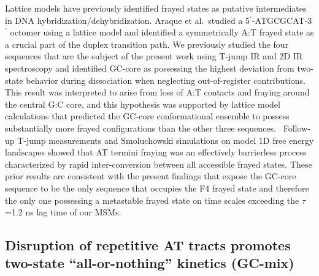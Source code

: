 \documentclass[journal=jpcbfk,manuscript=article]{achemso}
\begin{document}
Lattice models have previously identified frayed states as putative intermediates in DNA hybridization/dehybridization.\citep{Araque2016LatticeCooperativity, Phys2019,Sanstead2016} Araque et al.\ studied a 5$^\prime$-ATGCGCAT-3$^\prime$ octomer using a lattice model and identified a symmetrically A:T frayed state as a crucial part of the duplex transition path.\citep{Araque2016LatticeCooperativity} We previously studied the four sequences that are the subject of the present work using T-jump IR and 2D IR spectroscopy and identified GC-core as possessing the highest deviation from two-state behavior during dissociation when neglecting out-of-register contributions.\citep{Sanstead2016} This result was interpreted to arise from loss of A:T contacts and fraying around the central G:C core, and this hypothesis was supported by lattice model calculations that predicted the GC-core conformational ensemble to possess substantially more frayed configurations than the other three sequences.~\citep{Phys2019} Follow-up T-jump measurements and Smoluchowski simulations on model 1D free energy landscapes showed that AT termini fraying was an effectively barrierless process characterized by rapid inter-conversion between all accessible frayed states.\citep{Sanstead2018DirectDehybridization} These prior results are consistent with the present findings that expose the GC-core sequence to be the only sequence that occupies the F4 frayed state and therefore the only one possessing a metastable frayed state on time scales exceeding the $\tau$=1.2 ns lag time of our MSMs.




\subsection{Disruption of repetitive AT tracts promotes two-state ``all-or-nothing'' kinetics (GC-mix)}
\end{document}
